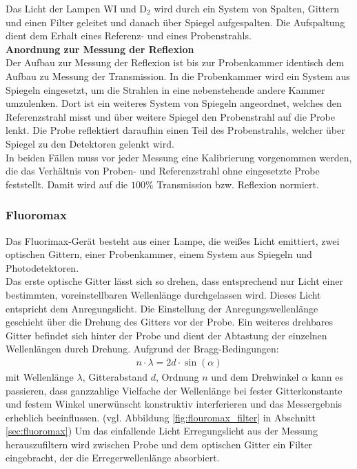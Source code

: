             Das Licht der Lampen WI und D$_2$ wird durch ein System von Spalten, Gittern und einen Filter geleitet und danach über Spiegel aufgespalten. Die Aufspaltung dient dem Erhalt eines Referenz- und eines Probenstrahls. \\
        \textbf{Anordnung zur Messung der Reflexion}\\
            Der Aufbau zur Messung der Reflexion ist bis zur Probenkammer identisch dem Aufbau zu Messung der Transmission. In die Probenkammer wird ein System aus Spiegeln eingesetzt, um die Strahlen in eine nebenstehende andere Kammer umzulenken. Dort ist ein weiteres System von Spiegeln angeordnet, welches den Referenzstrahl misst und über weitere Spiegel den Probenstrahl auf die Probe lenkt. Die Probe reflektiert daraufhin einen Teil des Probenstrahls, welcher über Spiegel zu den Detektoren gelenkt wird.\\
            In beiden Fällen muss vor jeder Messung eine Kalibrierung vorgenommen werden, die das Verhältnis von Proben- und Referenzstrahl ohne eingesetzte Probe feststellt. Damit wird auf die $100\unit{\%}$ Transmission bzw. Reflexion normiert.
    \subsubsection{Fluoromax}
        Das Fluorimax-Gerät besteht aus einer Lampe, die weißes Licht emittiert, zwei optischen Gittern, einer Probenkammer, einem System aus Spiegeln und Photodetektoren.\\
        Das erste optische Gitter lässt sich so drehen, dass entsprechend nur Licht einer bestimmten, voreinstellbaren Wellenlänge durchgelassen wird. Dieses Licht entspricht dem Anregungslicht. Die Einstellung der Anregungswellenlänge geschieht über die Drehung des Gitters vor der Probe. Ein weiteres drehbares Gitter befindet sich hinter der Probe und dient der Abtastung der einzelnen Wellenlängen durch Drehung. Aufgrund der Bragg-Bedingungen:
        \begin{align}
             n\cdot \lambda = 2d \cdot \sin(\alpha)
             \label{bragg1}
        \end{align}
        mit Wellenlänge $\lambda$, Gitterabstand $d$, Ordnung $n$ und dem Drehwinkel $\alpha$
        kann es passieren, dass ganzzahlige Vielfache der Wellenlänge bei fester Gitterkonstante und festem Winkel unerwünscht konstruktiv interferieren und das Messergebnis erheblich beeinflussen. (vgl. Abbildung \ref{fig:flouromax_filter} in Abschnitt \ref{sec:fluoromax}) Um das einfallende Licht Erregungslicht aus der Messung herauszufiltern wird zwischen Probe und dem optischen Gitter ein Filter eingebracht, der die Erregerwellenlänge absorbiert. 
